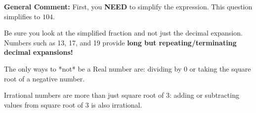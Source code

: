 \documentclass{extbook}[14pt]
\begin{document}
\begin{enumerate}
{\textbf{General Comment:} First, you \textbf{NEED} to simplify the expression. This question simplifies to $104$. 
 
 Be sure you look at the simplified fraction and not just the decimal expansion. Numbers such as 13, 17, and 19 provide \textbf{long but repeating/terminating decimal expansions!} 
 
 The only ways to *not* be a Real number are: dividing by 0 or taking the square root of a negative number. 
 
 Irrational numbers are more than just square root of 3: adding or subtracting values from square root of 3 is also irrational.
}
\end{enumerate}
\end{document}
